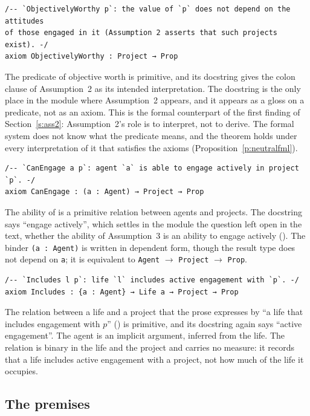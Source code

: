 \begin{lstlisting}
/-- `ObjectivelyWorthy p`: the value of `p` does not depend on the attitudes
of those engaged in it (Assumption 2 asserts that such projects exist). -/
axiom ObjectivelyWorthy : Project → Prop
\end{lstlisting}

The predicate of objective worth is primitive, and its docstring gives the colon clause of Assumption~2 as its intended interpretation. The docstring is the only place in the module where Assumption~2 appears, and it appears as a gloss on a predicate, not as an axiom. This is the formal counterpart of the first finding of Section~\ref{s:ass2}: Assumption~2's role is to interpret, not to derive. The formal system does not know what the predicate means, and the theorem holds under every interpretation of it that satisfies the axioms (Proposition~\ref{p:neutralfml}).

\begin{lstlisting}
/-- `CanEngage a p`: agent `a` is able to engage actively in project `p`. -/
axiom CanEngage : (a : Agent) → Project → Prop
\end{lstlisting}

The ability of  is a primitive relation between agents and projects. The docstring says \enquote{engage actively}, which settles in the module the question left open in the text, whether the ability of Assumption~3 is an ability to engage actively (). The binder \texttt{(a : Agent)} is written in dependent form, though the result type does not depend on \texttt{a}; it is equivalent to \texttt{Agent} $\to$ \texttt{Project} $\to$ \texttt{Prop}.

\begin{lstlisting}
/-- `Includes l p`: life `l` includes active engagement with `p`. -/
axiom Includes : {a : Agent} → Life a → Project → Prop
\end{lstlisting}

The relation between a life and a project that the prose expresses by \enquote{a life that includes engagement with $p$} () is primitive, and its docstring again says \enquote{active engagement}. The agent is an implicit argument, inferred from the life. The relation is binary in the life and the project and carries no measure: it records that a life includes active engagement with a project, not how much of the life it occupies.

\subsection{The premises}

